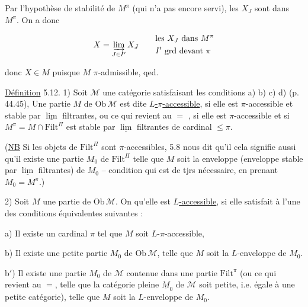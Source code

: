 Par l'hypothèse de stabilité de $M^\pi$ (qui n'a pas encore servi), les $X_J$ sont dans $M^\pi$. On a donc

\[
X=\varinjlim_{J\in I'}X_J \qquad
\begin{aligned}
 &\text{les $X_J$ dans $M^\pi$}\\
 &\text{$I'$ grd devant $\pi$}
\end{aligned}
\]

donc $X\in M$ puisque $M$ $\pi$-admissible, qed.


\uline{Définition} 5.12. 1) Soit $\mathcal M$ une catégorie satisfaisant les conditions a) b) c) d) (p. 44.\unsure{--|$=$}45),  Une partie $M$ de $\mathrm{Ob}\,\mathcal M$ est dite \uline{$L$-$\pi$-accessible}, si elle est $\pi$-accessible et stable par  $\underline{\lim}$ filtrantes\unsure{*}, ou ce qui revient au $=$ , si elle est $\pi$-accessible et si $M^\pi=M\cap\mathrm{Filt}^{\Pi}$ est stable par $\underline{\lim}$ filtrantes de cardinal $\leq\pi$.


(\uline{NB} Si les objets de $\mathrm{Filt}^{\Pi}$ sont $\pi$-accessibles, 5.8 nous dit qu'il cela signifie aussi qu'il  existe une partie $M_0$ de $\mathrm{Filt}^{\Pi}$ telle que $M$ soit la enveloppe (enveloppe stable par $\underline{\lim}$ filtrantes) de $M_0$ -- condition qui est de   tjrs nécessaire, en prenant $M_0=M^\pi$.)

2) Soit $M$ une partie de $\mathrm{Ob}\,\mathcal M$. On  qu'elle est \uline{$L$-accessible}, si elle satisfait à l'une des   conditions équivalentes suivantes :

a) Il existe un cardinal $\pi$ tel que $M$ soit $L$-$\pi$-accessible, 


b) Il existe une petite partie $M_0$ de $\mathrm{Ob}\,\mathcal M$, telle que $M$ soit la $L$-enveloppe de $M_0$.


b$'$) Il existe une partie $M_0$ de $\mathcal M$ contenue dans une partie $\mathrm{Filt}^{\pi}$ (ou ce qui revient au $=$, telle que la  catégorie pleine  $\underline M_0$ de $\mathcal M$ soit  petite, i.e. égale à une petite catégorie), telle que $M$ soit la $L$-enveloppe de $M_0$.

